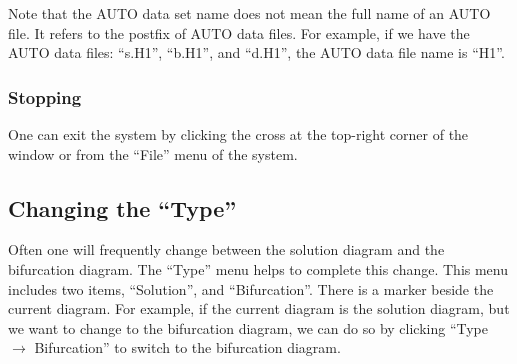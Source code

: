 Note that the AUTO data set name does not mean the full name of an AUTO file. It refers to
the postfix of AUTO data files. For example, if we have the AUTO
data files: ``s.H1'', ``b.H1'', and ``d.H1'', the AUTO data file name is ``H1''.

\subsubsection{Stopping}

One can exit the system by
clicking the cross at the top-right corner of the window or from the ``File'' menu of the system.

\subsection{Changing the ``Type''}

Often one will frequently change between the solution diagram and the bifurcation diagram.
The ``Type'' menu helps to complete this change. This menu includes two
items, ``Solution'', and ``Bifurcation''. There is a marker beside the current
diagram. For example, if the current diagram is the solution diagram, 
but we want to change to the bifurcation diagram, 
we can do so by clicking ``Type $\to$ Bifurcation'' to switch to the
bifurcation diagram. 

